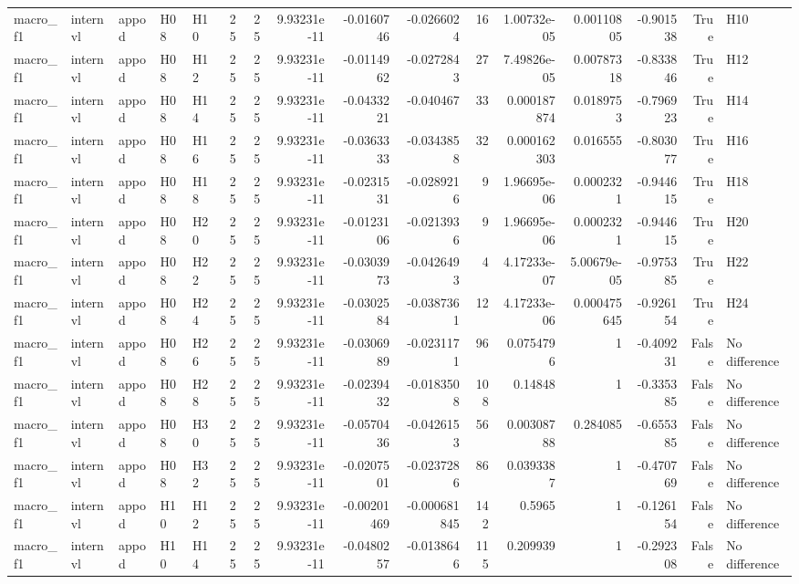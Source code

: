 \begin{longtable}{lllllrrrrrrrrrrl}
macro\_f1 & internvl & appod & H08 & H10 & 25 & 25 & 9.93231e-11 & -0.0160746 & -0.0266024 & 16 & 1.00732e-05 & 0.00110805 & -0.901538 & True & H10 \\
macro\_f1 & internvl & appod & H08 & H12 & 25 & 25 & 9.93231e-11 & -0.0114962 & -0.0272843 & 27 & 7.49826e-05 & 0.00787318 & -0.833846 & True & H12 \\
macro\_f1 & internvl & appod & H08 & H14 & 25 & 25 & 9.93231e-11 & -0.0433221 & -0.040467 & 33 & 0.000187874 & 0.0189753 & -0.796923 & True & H14 \\
macro\_f1 & internvl & appod & H08 & H16 & 25 & 25 & 9.93231e-11 & -0.0363333 & -0.0343858 & 32 & 0.000162303 & 0.016555 & -0.803077 & True & H16 \\
macro\_f1 & internvl & appod & H08 & H18 & 25 & 25 & 9.93231e-11 & -0.0231531 & -0.0289216 & 9 & 1.96695e-06 & 0.0002321 & -0.944615 & True & H18 \\
macro\_f1 & internvl & appod & H08 & H20 & 25 & 25 & 9.93231e-11 & -0.0123106 & -0.0213936 & 9 & 1.96695e-06 & 0.0002321 & -0.944615 & True & H20 \\
macro\_f1 & internvl & appod & H08 & H22 & 25 & 25 & 9.93231e-11 & -0.0303973 & -0.0426493 & 4 & 4.17233e-07 & 5.00679e-05 & -0.975385 & True & H22 \\
macro\_f1 & internvl & appod & H08 & H24 & 25 & 25 & 9.93231e-11 & -0.0302584 & -0.0387361 & 12 & 4.17233e-06 & 0.000475645 & -0.926154 & True & H24 \\
macro\_f1 & internvl & appod & H08 & H26 & 25 & 25 & 9.93231e-11 & -0.0306989 & -0.0231171 & 96 & 0.0754796 & 1 & -0.409231 & False & No difference \\
macro\_f1 & internvl & appod & H08 & H28 & 25 & 25 & 9.93231e-11 & -0.0239432 & -0.0183508 & 108 & 0.14848 & 1 & -0.335385 & False & No difference \\
macro\_f1 & internvl & appod & H08 & H30 & 25 & 25 & 9.93231e-11 & -0.0570436 & -0.0426153 & 56 & 0.00308788 & 0.284085 & -0.655385 & False & No difference \\
macro\_f1 & internvl & appod & H08 & H32 & 25 & 25 & 9.93231e-11 & -0.0207501 & -0.0237286 & 86 & 0.0393387 & 1 & -0.470769 & False & No difference \\
macro\_f1 & internvl & appod & H10 & H12 & 25 & 25 & 9.93231e-11 & -0.00201469 & -0.000681845 & 142 & 0.5965 & 1 & -0.126154 & False & No difference \\
macro\_f1 & internvl & appod & H10 & H14 & 25 & 25 & 9.93231e-11 & -0.0480257 & -0.0138646 & 115 & 0.209939 & 1 & -0.292308 & False & No difference \\

\end{longtable}

